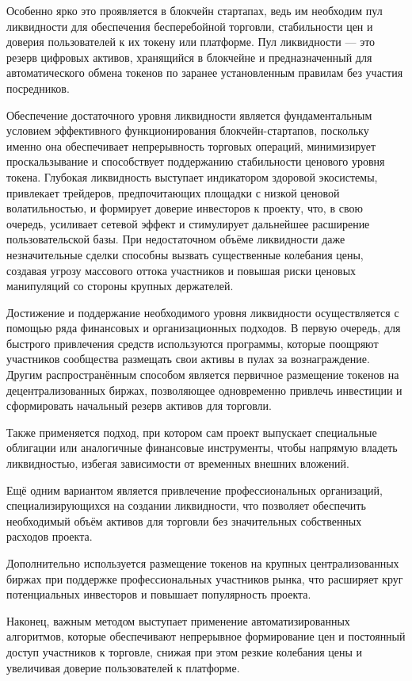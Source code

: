 \documentclass[
    14pt,
    specialist,
    candidate, %
    subf, %
    href,
    dotsinheaders=false
]{disser}
\begin{document}
Особенно ярко это проявляется в блокчейн стартапах, ведь им необходим пул ликвидности для обеспечения бесперебойной торговли, стабильности цен и доверия пользователей к их токену или платформе. Пул ликвидности — это резерв цифровых активов, хранящийся в блокчейне и предназначенный для автоматического обмена токенов по заранее установленным правилам без участия посредников.

Обеспечение достаточного уровня ликвидности является фундаментальным условием эффективного функционирования блокчейн-стартапов, поскольку именно она обеспечивает непрерывность торговых операций, минимизирует проскальзывание и способствует поддержанию стабильности ценового уровня токена. Глубокая ликвидность выступает индикатором здоровой экосистемы, привлекает трейдеров, предпочитающих площадки с низкой ценовой волатильностью, и формирует доверие инвесторов к проекту, что, в свою очередь, усиливает сетевой эффект и стимулирует дальнейшее расширение пользовательской базы. При недостаточном объёме ликвидности даже незначительные сделки способны вызвать существенные колебания цены, создавая угрозу массового оттока участников и повышая риски ценовых манипуляций со стороны крупных держателей.

Достижение и поддержание необходимого уровня ликвидности осуществляется с помощью ряда финансовых и организационных подходов. В первую очередь, для быстрого привлечения средств используются программы, которые поощряют участников сообщества размещать свои активы в пулах за вознаграждение. Другим распространённым способом является первичное размещение токенов на децентрализованных биржах, позволяющее одновременно привлечь инвестиции и сформировать начальный резерв активов для торговли.

Также применяется подход, при котором сам проект выпускает специальные облигации или аналогичные финансовые инструменты, чтобы напрямую владеть ликвидностью, избегая зависимости от временных внешних вложений.

Ещё одним вариантом является привлечение профессиональных организаций, специализирующихся на создании ликвидности, что позволяет обеспечить необходимый объём активов для торговли без значительных собственных расходов проекта.

Дополнительно используется размещение токенов на крупных централизованных биржах при поддержке профессиональных участников рынка, что расширяет круг потенциальных инвесторов и повышает популярность проекта.

Наконец, важным методом выступает применение автоматизированных алгоритмов, которые обеспечивают непрерывное формирование цен и постоянный доступ участников к торговле, снижая при этом резкие колебания цены и увеличивая доверие пользователей к платформе.
\end{document}
